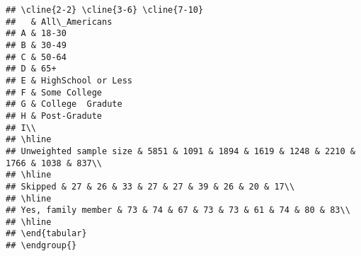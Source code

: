 \documentclass[
]{article}
\begin{document}
\begin{verbatim}
## \cline{2-2} \cline{3-6} \cline{7-10}
##   & All\_Americans
## A & 18-30
## B & 30-49
## C & 50-64
## D & 65+
## E & HighSchool or Less
## F & Some College
## G & College  Gradute
## H & Post-Gradute
## I\\
## \hline
## Unweighted sample size & 5851 & 1091 & 1894 & 1619 & 1248 & 2210 & 1766 & 1038 & 837\\
## \hline
## Skipped & 27 & 26 & 33 & 27 & 27 & 39 & 26 & 20 & 17\\
## \hline
## Yes, family member & 73 & 74 & 67 & 73 & 73 & 61 & 74 & 80 & 83\\
## \hline
## \end{tabular}
## \endgroup{}
\end{verbatim}
\end{document}
